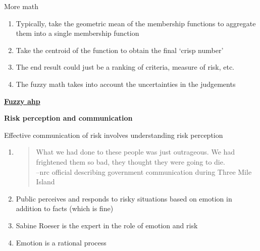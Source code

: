\documentclass[aspectratio=1610,pdftex,dvipsnames,compress,xcolor={dvipsnames}]{beamer}
\newcommand{\acs}{\acrshort} %
\begin{document}
\begin{frame}{More math}
    \begin{enumerate}[series=outerlist,topsep=0pt,itemsep=21pt,leftmargin=*,label=(\arabic*)]
        \item[]Typically, take the geometric mean of the membership functions to aggregate them into a single membership function
        \item[]Take the centroid of the function to obtain the final `crisp number'
        \item[]The end result could just be a ranking of criteria, measure of risk, etc.
        \item[]The fuzzy math takes into account the uncertainties in the judgements
    \end{enumerate}
\end{frame}


\begin{frame}[plain]{}
    \centering\LARGE\textbf{\href{https://www.sciencedirect.com/science/article/pii/S0149197021004352}{Fuzzy \acs{ahp}}}
\end{frame}


\begin{frame}[plain]{}
    \centering\LARGE\textbf{Risk perception and communication}
\end{frame}


\addtocounter{framenumber}{-2}
\begin{frame}{Effective communication of risk involves understanding risk perception}
    \begin{enumerate}[series=outerlist,topsep=0pt,itemsep=21pt,leftmargin=*,label=(\arabic*)]
        \item[]
            \begin{quote}
                What we had done to these people was just outrageous. We had frightened them so bad, they thought they were going to die. \\
                --\acs{nrc} official describing government communication during Three Mile Island
            \end{quote}
        \item[]Public perceives and responds to risky situations based on emotion in addition to facts (which is fine)
        \item[]Sabine Roeser is the expert in the role of emotion and risk  
        \item[]Emotion is a rational process
    \end{enumerate}
\end{frame}
\end{document}
